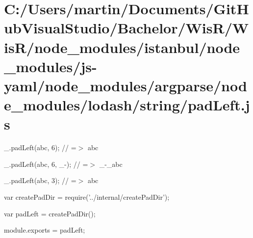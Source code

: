 \hypertarget{_c_1_2_users_2martin_2_documents_2_git_hub_visual_studio_2_bachelor_2_wis_r_2_wis_r_2node_moduleb39fb5270d626ef44d9a7f3252ed491e}{}\section{C\+:/\+Users/martin/\+Documents/\+Git\+Hub\+Visual\+Studio/\+Bachelor/\+Wis\+R/\+Wis\+R/node\+\_\+modules/istanbul/node\+\_\+modules/js-\/yaml/node\+\_\+modules/argparse/node\+\_\+modules/lodash/string/pad\+Left.\+js}
\+\_\+.\+pad\+Left(\textquotesingle{}abc\textquotesingle{}, 6); // =$>$ \textquotesingle{} abc\textquotesingle{}

\+\_\+.\+pad\+Left(\textquotesingle{}abc\textquotesingle{}, 6, \textquotesingle{}\+\_\+-\/\textquotesingle{}); // =$>$ \textquotesingle{}\+\_\+-\/\+\_\+abc\textquotesingle{}

\+\_\+.\+pad\+Left(\textquotesingle{}abc\textquotesingle{}, 3); // =$>$ \textquotesingle{}abc\textquotesingle{}


\begin{DoxyCodeInclude}
var createPadDir = require(\textcolor{stringliteral}{'../internal/createPadDir'});

var padLeft = createPadDir();

module.exports = padLeft;
\end{DoxyCodeInclude}
 